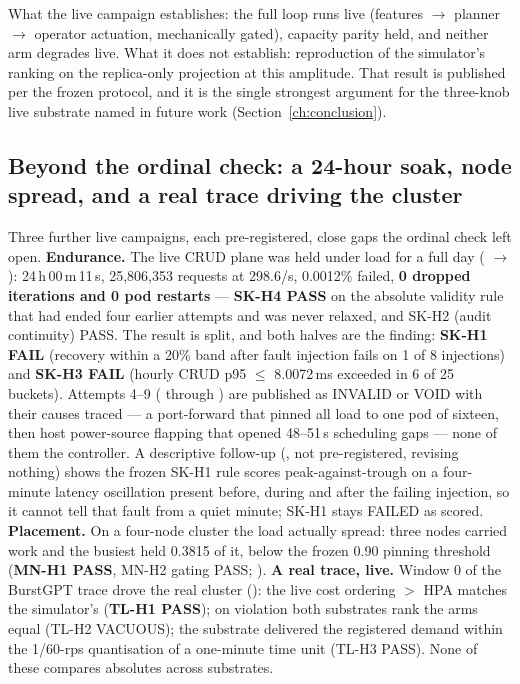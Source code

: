 What the live campaign establishes: the full \jcac{} loop runs live
(features $\to$ planner $\to$ operator actuation, mechanically gated),
capacity parity held, and neither arm degrades live. What it does not
establish: reproduction of the simulator's ranking on the replica-only
projection at this amplitude. That result is published per the frozen
protocol, and it is the single strongest argument for the three-knob live
substrate named in future work (Section~\ref{ch:conclusion}).

\subsection{Beyond the ordinal check: a 24-hour soak, node spread, and a
real trace driving the cluster}
\label{sec:eval-live-more}

Three further live campaigns, each pre-registered, close gaps the ordinal
check left open. \textbf{Endurance.} The live CRUD plane was held under
load for a full day ( $\to$
): 24\,h\,00\,m\,11\,s, 25{,}806{,}353
requests at 298.6/s, 0.0012\% failed, \textbf{0 dropped iterations and 0
pod restarts} --- \textbf{SK-H4 PASS} on the absolute validity rule that
had ended four earlier attempts and was never relaxed, and SK-H2 (audit
continuity) PASS. The result is split, and both halves are the finding:
\textbf{SK-H1 FAIL} (recovery within a 20\% band after fault injection
fails on 1 of 8 injections) and \textbf{SK-H3 FAIL} (hourly CRUD p95
$\le$ 8.0072\,ms exceeded in 6 of 25 buckets). Attempts 4--9
( through ) are published
as INVALID or VOID with their causes traced --- a port-forward that pinned
all load to one pod of sixteen, then host power-source flapping that opened
48--51\,s scheduling gaps --- none of them the controller. A descriptive
follow-up (, not pre-registered,
revising nothing) shows the frozen SK-H1 rule scores peak-against-trough on
a four-minute latency oscillation present before, during and after the
failing injection, so it cannot tell that fault from a quiet minute; SK-H1
stays FAILED as scored. \textbf{Placement.} On a four-node cluster the load
actually spread: three nodes carried work and the busiest held 0.3815 of
it, below the frozen 0.90 pinning threshold (\textbf{MN-H1 PASS}, MN-H2
gating PASS; ). \textbf{A real trace, live.}
Window 0 of the BurstGPT trace drove the real cluster
(): the live cost ordering \jcac{} $>$ HPA
matches the simulator's (\textbf{TL-H1 PASS}); on violation both
substrates rank the arms equal (TL-H2 VACUOUS);
the substrate delivered the registered demand within the 1/60-rps
quantisation of a one-minute time unit (TL-H3 PASS). None of these
compares absolutes across substrates.

